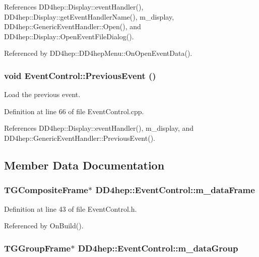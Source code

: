 References DD4hep::Display::eventHandler(), DD4hep::Display::getEventHandlerName(), m\_\-display, DD4hep::GenericEventHandler::Open(), and DD4hep::Display::OpenEventFileDialog().

Referenced by DD4hep::DD4hepMenu::OnOpenEventData().\hypertarget{class_d_d4hep_1_1_event_control_aa313ad37f6a3a7b3d5a26abb37c051d3}{
\subsubsection[{PreviousEvent}]{\setlength{\rightskip}{0pt plus 5cm}void EventControl::PreviousEvent ()}}
\label{class_d_d4hep_1_1_event_control_aa313ad37f6a3a7b3d5a26abb37c051d3}


Load the previous event. 

Definition at line 66 of file EventControl.cpp.

References DD4hep::Display::eventHandler(), m\_\-display, and DD4hep::GenericEventHandler::PreviousEvent().

\subsection{Member Data Documentation}
\hypertarget{class_d_d4hep_1_1_event_control_aee2bb0377218bcfbad0fc757ffd926cb}{
\subsubsection[{m\_\-dataFrame}]{\setlength{\rightskip}{0pt plus 5cm}TGCompositeFrame$\ast$ {\bf DD4hep::EventControl::m\_\-dataFrame}}}
\label{class_d_d4hep_1_1_event_control_aee2bb0377218bcfbad0fc757ffd926cb}


Definition at line 43 of file EventControl.h.

Referenced by OnBuild().\hypertarget{class_d_d4hep_1_1_event_control_af0528badfa37dba89e2d73c83f246e08}{
\subsubsection[{m\_\-dataGroup}]{\setlength{\rightskip}{0pt plus 5cm}TGGroupFrame$\ast$ {\bf DD4hep::EventControl::m\_\-dataGroup}}}
\label{class_d_d4hep_1_1_event_control_af0528badfa37dba89e2d73c83f246e08}



